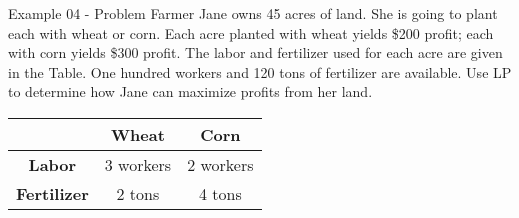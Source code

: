 \begin{frame}{Example 04 - Problem}
Farmer Jane owns 45 acres of land. She is going to plant each with wheat or 
corn. Each acre planted with wheat yields \$200 profit; each with corn yields 
\$300 profit. The labor and fertilizer used for each acre are given in the 
Table. One hundred workers and 120 tons of fertilizer are available. Use LP to 
determine how Jane can maximize profits from her land.

\begin{center}
\begin{tabular}{|c||c|c|}
\hline
& \cellcolor{gray90}\textbf{Wheat} 
& \cellcolor{gray90}\textbf{Corn} \\
\hline
\hline \cellcolor{gray90}\textbf{Labor}      & 3 workers & 2 workers \\
\hline \cellcolor{gray90}\textbf{Fertilizer} & 2 tons    & 4 tons \\
\hline 
\end{tabular}
\end{center}

\end{frame}
